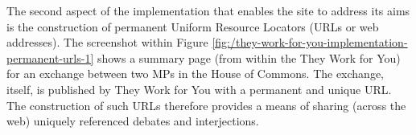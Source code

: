 The second aspect of the implementation that enables the site to address its aims is the construction of permanent Uniform Resource Locators (URLs or web addresses).
The screenshot within Figure \ref{fig:/they-work-for-you-implementation-permanent-urls-1} shows a summary page (from within the They Work for You) for an exchange between two MPs in the House of Commons. 
The exchange, itself, is published by They Work for You with a permanent and unique URL. The construction of such URLs therefore provides a means of sharing (across the web) uniquely referenced debates and interjections.